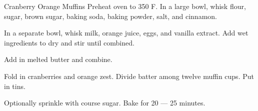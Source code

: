 \documentclass[../cookbook.tex]{subfiles}
\begin{document}
\begin{recipe}{Cranberry Orange Muffins}{}{}
    Preheat oven to 350\degrees{} F.
    In a large bowl, whisk flour, sugar, brown sugar,
    baking soda, baking powder, salt, and cinnamon.

    In a separate bowl, whisk milk, orange juice, eggs,
    and vanilla extract. Add wet ingredients to dry and
    stir until combined.
    
    Add in melted butter and combine.

    Fold in cranberries and orange zest. Divide batter
    among twelve muffin cups. Put in tins.

    Optionally sprinkle with course sugar. Bake for 20
    --- 25 minutes.
\end{recipe}
\end{document}
